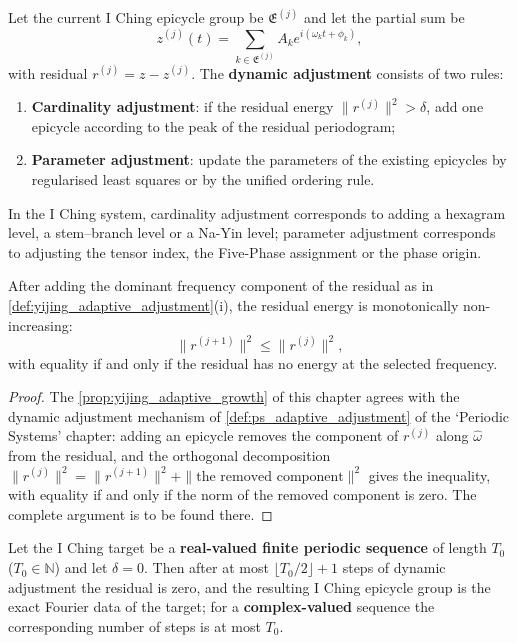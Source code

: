 \begin{definition}\label{def:yijing_adaptive_adjustment}
Let the current I Ching epicycle group be $\mathfrak E^{(j)}$ and let the partial sum be
\[
z^{(j)}(t)=\sum_{k\in\mathfrak E^{(j)}}A_k e^{i(\omega_k t+\phi_k)},
\]
with residual $r^{(j)}=z-z^{(j)}$. The \textbf{dynamic adjustment} consists of two rules:
\begin{enumerate}[label=(\roman*)]
    \item \textbf{Cardinality adjustment}: if the residual energy $\|r^{(j)}\|^2>\delta$, add one epicycle according to the peak of the residual periodogram;
    \item \textbf{Parameter adjustment}: update the parameters of the existing epicycles by regularised least squares or by the unified ordering rule.
\end{enumerate}
In the I Ching system, cardinality adjustment corresponds to adding a hexagram level, a stem--branch level or a Na-Yin level; parameter adjustment corresponds to adjusting the tensor index, the Five-Phase assignment or the phase origin.
\end{definition}

\begin{proposition}\label{prop:yijing_adaptive_growth}
After adding the dominant frequency component of the residual as in \cref{def:yijing_adaptive_adjustment}(i), the residual energy is monotonically non-increasing:
\[
\|r^{(j+1)}\|^2\le\|r^{(j)}\|^2,
\]
with equality if and only if the residual has no energy at the selected frequency.
\end{proposition}

\begin{proof}
The \cref{prop:yijing_adaptive_growth} of this chapter agrees with the dynamic adjustment mechanism of \cref{def:ps_adaptive_adjustment} of the `Periodic Systems' chapter:
adding an epicycle removes the component of $r^{(j)}$ along $\hat\omega$ from the residual, and the orthogonal decomposition
$\|r^{(j)}\|^2=\|r^{(j+1)}\|^2+\|\text{the removed component}\|^2$ gives the inequality,
with equality if and only if the norm of the removed component is zero. The complete argument is to be found there.
\end{proof}

\begin{theorem}\label{thm:yijing_adaptive_convergence}
Let the I Ching target be a \textbf{real-valued finite periodic sequence} of length $T_0$ ($T_0\in\mathbb N$) and let $\delta=0$. Then after at most $\lfloor T_0/2\rfloor+1$ steps of dynamic adjustment the residual is zero, and the resulting I Ching epicycle group is the exact Fourier data of the target; for a \textbf{complex-valued} sequence the corresponding number of steps is at most $T_0$.
\end{theorem}

